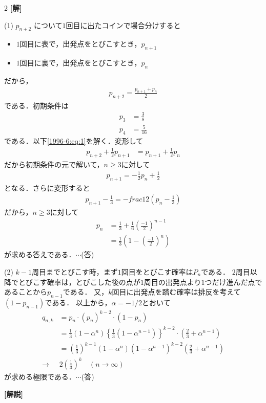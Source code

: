 \documentclass[../../../../main.tex]{subfiles}
\begin{document}
\setcounter{equation}{0}
\begin{oframed}
  
\end{oframed}
\setlength{\columnseprule}{0.4pt}
\begin{multicols}{2}
  {\bf[解]}

  (1) $p_{n+2}$ について$1$回目に出たコインで場合分けすると
  \begin{itemize}
    \item $1$回目に表で，出発点をとびこすとき，$p_{n+1}$  \\
    \item $1$回目に裏で，出発点をとびこすとき，$p_n$
  \end{itemize}
  だから，
  \begin{align}
    p_{n+2} = \frac{p_{n+1} + p_n}{2} \label{1996-6:eq:1}
  \end{align}
  である．初期条件は
  \begin{align*}
    p_3 & =\frac{3}{8}  \\
    p_4 & =\frac{5}{16}
  \end{align*}
  である．以下\cref{1996-6:eq:1}を解く．変形して
  \begin{align*}
    p_{n+2}+\frac{1}{2}p_{n+1} & = p_{n+1}+\frac{1}{2}p_{n}
  \end{align*}
  だから初期条件の元で解いて，$n\ge 3$に対して
  \begin{align*}
    p_{n+1} = -\frac{1}{2}p_{n}+\frac{1}{2}
  \end{align*}
  となる．さらに変形すると
  \begin{align*}
    p_{n+1}-\frac{1}{3} = -frac{1}{2}\left(p_{n}-\frac{1}{3}\right)
  \end{align*}
  だから，$n\ge 3$に対して
  \begin{align*}
    p_n
     & = \frac{1}{3} + \frac{1}{6}\left(\frac{-1}{2}\right)^{n-1} \\
     & = \frac{1}{3}\left(1-\left(\frac{-1}{2}\right)^{n}\right)
  \end{align*}
  が求める答えである．$\cdots$(答)

  \vspace{10pt}
  (2)
  $k-1$周目までとびこす時，まず$1$回目をとびこす確率は$P_n$である．
  $2$周目以降でとびこす確率は，とびこした後の点が$1$周目の出発点より$1$つだけ進んだ点であることから$p_{n-1}$である．
  又，$k$回目に出発点を踏む確率は排反を考えて$(1-p_{n-1})$である．
  以上から，$\alpha=-1/2$とおいて
  \begin{align*}
    q_{n,k}
                & =  p_n \cdot (p_n)^{k-2} \cdot (1-p_n)                                                                                    \\
                & =  \frac{1}{3}(1-\alpha^n) \left\{ \frac{1}{3}(1-\alpha^{n-1}) \right\}^{k-2} \cdot \left(\frac{2}{3}+\alpha^{n-1}\right) \\
                & =  \left(\frac{1}{3}\right)^{k-1}(1-\alpha^n)(1-\alpha^{n-1})^{k-2} \left(\frac{2}{3}+\alpha^{n-1}\right)                 \\
    \rightarrow & 2\left(\frac{1}{3}\right)^k \quad (n \rightarrow \infty)
  \end{align*}
  が求める極限である．$\cdots$(答)

  \vspace{10pt}
  {\bf[解説]}
  \newpage
\end{multicols}
\end{document}
